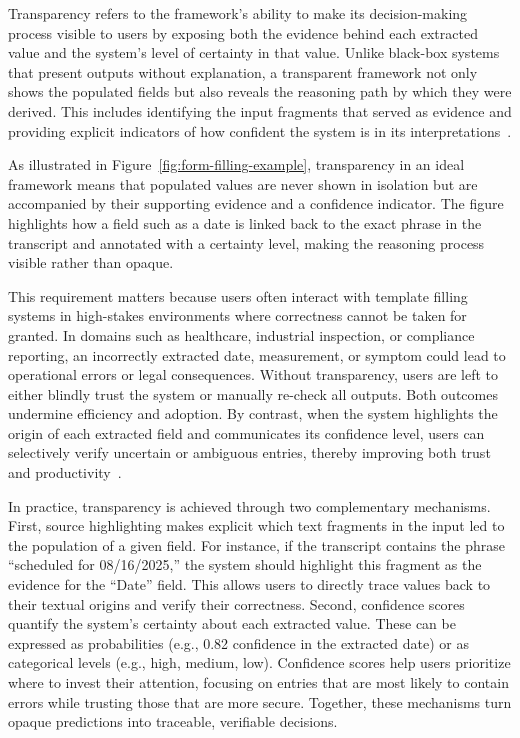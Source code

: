 Transparency refers to the framework’s ability to make its decision-making process visible to users by exposing both the evidence behind each extracted value and the system’s level of certainty in that value. Unlike black-box systems that present outputs without explanation, a transparent framework not only shows the populated fields but also reveals the reasoning path by which they were derived. This includes identifying the input fragments that served as evidence and providing explicit indicators of how confident the system is in its interpretations~\cite{doshi2017towards, samek2019explainable}.  

As illustrated in Figure~\ref{fig:form-filling-example}, transparency in an ideal framework means that populated values are never shown in isolation but are accompanied by their supporting evidence and a confidence indicator. The figure highlights how a field such as a date is linked back to the exact phrase in the transcript and annotated with a certainty level, making the reasoning process visible rather than opaque.

This requirement matters because users often interact with template filling systems in high-stakes environments where correctness cannot be taken for granted. In domains such as healthcare, industrial inspection, or compliance reporting, an incorrectly extracted date, measurement, or symptom could lead to operational errors or legal consequences. Without transparency, users are left to either blindly trust the system or manually re-check all outputs. Both outcomes undermine efficiency and adoption. By contrast, when the system highlights the origin of each extracted field and communicates its confidence level, users can selectively verify uncertain or ambiguous entries, thereby improving both trust and productivity~\cite{wang2022trust, ribeiro2016should}.  

In practice, transparency is achieved through two complementary mechanisms. First, source highlighting makes explicit which text fragments in the input led to the population of a given field. For instance, if the transcript contains the phrase “scheduled for 08/16/2025,” the system should highlight this fragment as the evidence for the “Date” field. This allows users to directly trace values back to their textual origins and verify their correctness. Second, confidence scores quantify the system’s certainty about each extracted value. These can be expressed as probabilities (e.g., 0.82 confidence in the extracted date) or as categorical levels (e.g., high, medium, low). Confidence scores help users prioritize where to invest their attention, focusing on entries that are most likely to contain errors while trusting those that are more secure. Together, these mechanisms turn opaque predictions into traceable, verifiable decisions.  

